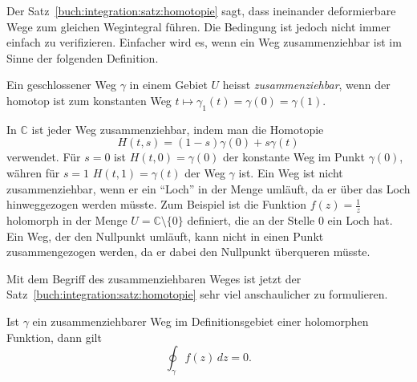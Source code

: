 Der Satz~\ref{buch:integration:satz:homotopie}
sagt, dass ineinander deformierbare Wege zum gleichen Wegintegral führen.
Die Bedingung ist jedoch nicht immer einfach zu verifizieren.
Einfacher wird es, wenn ein Weg zusammenziehbar ist im Sinne
der folgenden Definition.

\begin{definition}[zusammenziehbar]
\label{buch:integration:wegintegral:definition:zusammenziehbar}
Ein geschlossener Weg $\gamma$ in einem Gebiet $U$ heisst
\emph{zusammenziehbar}, wenn der homotop ist zum konstanten Weg
%
$t\mapsto \gamma_1(t)=\gamma(0)=\gamma(1)$.
\end{definition}

In $\mathbb{C}$ ist jeder Weg zusammenziehbar, indem man die Homotopie
\[
H(t,s)
=
(1-s)
\gamma(0)
+
s
\gamma(t) 
\]
verwendet.
Für $s=0$ ist $H(t,0) = \gamma(0)$ der konstante Weg im Punkt
$\gamma(0)$, währen für $s=1$
$H(t,1)=\gamma(t)$ der Weg $\gamma$ ist.
Ein Weg ist nicht zusammenziehbar, wenn er ein ``Loch'' in
der Menge umläuft, da er über das Loch hinweggezogen werden
müsste.
Zum Beispiel ist die Funktion $f(z)=\frac1z$ holomorph in
der Menge $U=\mathbb{C}\setminus\{0\}$ definiert, die an der Stelle
$0$ ein Loch hat.
Ein Weg, der den Nullpunkt umläuft, kann nicht in einen Punkt
zusammengezogen werden, da er dabei den Nullpunkt überqueren müsste.

Mit dem Begriff des zusammenziehbaren Weges ist jetzt
der Satz~\ref{buch:integration:satz:homotopie}
sehr viel anschaulicher zu formulieren.


\begin{satz}[Cauchy]
%
\label{buch:integration:wegintegral:satz:zusammenziehbar}
Ist $\gamma$ ein zusammenziehbarer Weg im Definitionsgebiet einer
holomorphen Funktion, dann gilt
\[
\oint_\gamma f(z)\, dz = 0.
\]
\end{satz}

